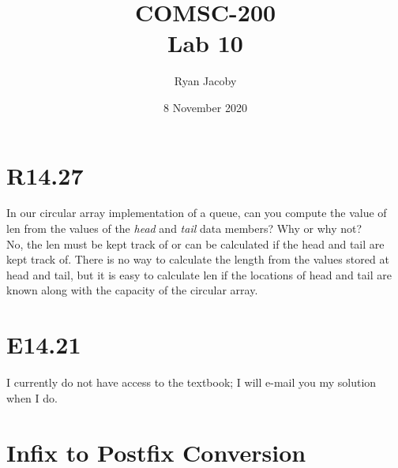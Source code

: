 \documentclass[letterpaper, 11pt]{article}
\title{COMSC-200 \\ Lab 10}
\author{Ryan Jacoby}
\date{8 November 2020}
\begin{document}
\maketitle

\section{R14.27}
In our circular array implementation of a queue, can you compute the value of len from the values of the \textit{head} and \textit{tail} data members?  Why or why not? \\

No, the len must be kept track of or can be calculated if the head and tail are kept track of.  There is no way to calculate the length from the values stored at head and tail, but it is easy to calculate len if the locations of head and tail are known along with the capacity of the circular array.

\section{E14.21}
I currently do not have access to the textbook; I will e-mail you my solution when I do.

\section{Infix to Postfix Conversion}
\end{document}

